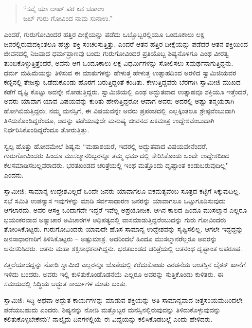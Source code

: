 \begin{verse}
“ಸವೈ ಯಾ ಲಾಖ್ ಪರ ಏಕ ಚಡಾಉ\\ಜಬ್ ಗುರು ಗೋವಿಂದ ನಾಮ ಸುನಾಉ.”
\end{verse}

ಎಂದರೆ, ಗುರುಗೋವಿಂದರ ಹತ್ತಿರ ದೀಕ್ಷೆಯನ್ನು ಪಡೆದು ಒಬ್ಬೊಬ್ಬರಲ್ಲಿಯೂ ಒಂದೂಕಾಲು ಲಕ್ಷ ಜನರಲ್ಲಿರುವುದಕ್ಕಿಂತಲೂ ಹೆಚ್ಚು ಶಕ್ತಿ ಸಂಚರಿಸುತ್ತಿತ್ತು. ಎಂದರೆ ಆತನ ಹತ್ತಿರ ದೀಕ್ಷೆಯನ್ನು ಪಡೆದರೆ ಆತನ ಶಕ್ತಿಯಿಂದ ಜೀವನದಲ್ಲಿ ನಿಜವಾದ ಧರ್ಮಪ್ರಾಣವು ಬಂದು ಗುರುಗೋವಿಂದರ ಪ್ರತಿಯೊಬ್ಬ ಶಿಷ್ಯನೊಳಗೂ ಎಂಥ ವೀರತ್ವ ತುಂಬಿಕೊಳ್ಳುತ್ತಿತ್ತೆಂದರೆ, ಅವನು ಆಗ ಒಂದೂಕಾಲು ಲಕ್ಷ ವಿಧರ್ಮಿಗಳನ್ನು ಸೋಲಿಸಲು ಸಮರ್ಥನಾಗುತ್ತಿದ್ದನು. ಧರ್ಮ ಮಹಿಮೆಯನ್ನು ತಿಳಿಸುವ ಈ ಮಾತುಗಳನ್ನು ಹೇಳುತ್ತ ಹೇಳುತ್ತ ಉತ್ಸಾಹದಿಂದ ಅರಳಿದ ಸ್ವಾಮಿಜಿಯವರ ಕಣ್ಣಿನಲ್ಲಿ ತೇಜಸ್ಸು ಒಡೆದುಕೊಂಡು ಹೊರಗೆ ಬರುತ್ತಿದ್ದಂತೆ ಕಂಡಿತು. ಕೇಳುತ್ತಿದ್ದವರು ಬೆರಗಾಗಿ ಸ್ವಾಮೀಜಿ ಮುಖದ ಕಡೆಗೆ ದೃಷ್ಟಿ ಕೊಟ್ಟು ಅದನ್ನೇ ನೋಡುತ್ತಿದ್ದರು. ಸ್ವಾಮಿಜಿಯಲ್ಲಿ ಎಂಥ ಅದ್ಭುತವಾದ ಉತ್ಸಾಹವೂ ಶಕ್ತಿಯೂ ಇತ್ತೆಂದರೆ, ಅವರು ಯಾವಾಗ ಯಾವ ವಿಷಯವನ್ನು ಕುರಿತು ಹೇಳುತ್ತಿದ್ದರೋ ಆವಾಗ ಅವರು ಅದರಲ್ಲಿ ಅಷ್ಟು ತನ್ಮಯರಾಗಿ ಹೋಗಿಬಿಡುತ್ತಿದ್ದರು; ನಮ್ಮ ಮನಸ್ಸಿಗೆ, ಈ ವಿಷಯವನ್ನೇ ಅವರು ಪ್ರಪಂಚದಲ್ಲಿ ಎಲ್ಲಕ್ಕಿಂತಲೂ ಶ್ರೇಷ್ಠವೆಂಬುದಾಗಿ ತಿಳಿದುಕೊಂಡಿದ್ದರೆಂದೂ, ಅದನ್ನು ಪಡೆಯುವುದೇ ಮನುಷ್ಯ ಜೀವನದ ಏಕಮಾತ್ರ ಉದ್ದೇಶವೆಂಬುದಾಗಿ ನಿರ್ಧರಿಸಿಕೊಂಡಿದ್ದರೆಂದೂ ತೋರುತ್ತಿತ್ತು.

ಸ್ವಲ್ಪ ಹೊತ್ತು ಹೋದಮೇಲೆ ಶಿಷ್ಯನು “ಮಹಾಶಯರೆ, ಇದರಲ್ಲಿ ಅದ್ಭುತವಾದ ವಿಷಯವೇನೆಂದರೆ, ಗುರುಗೋವಿಂದರು ಹಿಂದೂ ಮುಸಲ್ಮಾನರಿಬ್ಬರನ್ನೂ ತಮ್ಮ ಧರ್ಮದಲ್ಲಿ ಸೇರಿಸಿಕೊಂಡು ಒಂದೇ ಉದ್ದೇಶದಿಂದ ಕೆಲಸಮಾಡಿಸಬಲ್ಲವರಾದರು. ಭರತಖಂಡದ ಚರಿತ್ರೆಯಲ್ಲಿ ಇಂಥ ಮತ್ತೊಂದು ದೃಷ್ಟಾಂತ ಕಂಡುಬರುವುದಿಲ್ಲ" ಎಂದನು.

ಸ್ವಾಮೀಜಿ: ಸಾಮಾನ್ಯ ಉದ್ದೇಶವಿಲ್ಲದೆ ಒಂದೇ ಜನರು ಯಾವಾಗಲೂ ಐಕಮತ್ಯವೆಂಬ ಸೂತ್ರದ ಕಟ್ಟಿಗೆ ಸಿಕ್ಕುವುದಿಲ್ಲ. ಸಭೆ ಸಮಿತಿ ಉಪನ್ಯಾಸ ಇವುಗಳನ್ನು ಮಾಡಿ ಸರ್ವಸಾಧಾರಣ ಜನರನ್ನು ಯಾವಾಗಲೂ ಒಟ್ಟುಗೂಡಿಸುವುದು ಆಗಲಾರದು. ಅವರ ಆಸಕ್ತಿ ಒಂದಾಗದೇ ಇದ್ದರೆ ಇವೆಲ್ಲ ಅಪ್ರಯೋಜಕ. ಆಗಿನ ಕಾಲದ ಹಿಂದೂ ಮುಸಲ್ಮಾನ ಎಲ್ಲರೂ ಭಯಂಕರವಾದ ಅತ್ಯಾಚಾರ ಅವಿಚಾರಗಳ ಆಧಿಪತ್ಯದಲ್ಲಿ ವಾಸಮಾಡುತ್ತಿದ್ದರೆಂಬುದನ್ನು ಗುರು ಗೋವಿಂದರು ತೋರಿಸಿಕೊಟ್ಟರು. ಗುರುಗೋವಿಂದರು ಯಾವುದೇ ಹೊಸ ಸಾಮಾನ್ಯ ಉದ್ದೇಶವನ್ನು ಸೃಷ್ಟಿಸಲಿಲ್ಲ. ಆಗಲೇ ಇದ್ದದ್ದನ್ನು ಜನಸಾಧಾರಣರಿಗೆ ತಿಳಿಸಿಕೊಟ್ಟರು – ಅಷ್ಟುಮಾತ್ರ. ಅದರಿಂದಲೆ ಹಿಂದೂ ಮುಸಲ್ಮಾನರೆಲ್ಲರೂ ಅವರನ್ನು ಅನುಸರಿಸಿದರು. ಆತನು ಮಹಾ ಶಕ್ತಿಸಾಧಕನಾಗಿದ್ದನು. ಭರತಖಂಡದ ಚರಿತ್ರೆಯಲ್ಲಿ ಆತನಂಥ ದೃಷ್ಟಾಂತ ಅಪರೂಪ.

ಕತ್ತಲೆಯಾದದ್ದನ್ನು ನೋಡಿ ಸ್ವಾಮಿಜಿ ಎಲ್ಲರನ್ನೂ ಜೊತೆಯಲ್ಲಿ ಕರೆದುಕೊಂಡು ಎರಡನೆಯ ಅಂತಸ್ತಿನ ಬೈಠಕ್ ಖಾನೆಗೆ ಇಳಿದು ಬಂದರು. ಅವರು ಇಲ್ಲಿ ಕುಳಿತುಕೊಂಡೊಡನೆಯೆ ಎಲ್ಲರೂ ಅವರನ್ನು ಸುತ್ತಿಕೊಂಡು ಕುಳಿತರು. ಈ ಸಮಯದಲ್ಲಿ ಸಿದ್ಧಿಯ ಅದ್ಭುತ ಕಾರ್ಯಗಳ ಮಾತು ಬಂತು.

ಸ್ವಾಮಿಜಿ: ಸಿದ್ಧಿ ಅಥವಾ ಅದ್ಭುತ ಕಾರ್ಯಗಳನ್ನು ಮಾಡುವ ಶಕ್ತಿಯನ್ನು ಅತಿ ಸಾಮಾನ್ಯವಾದ ಚಿತ್ತಸಂಯಮದಿಂದಲೇ ಪಡೆಯಬಹುದು ಎಂದರು. ಶಿಷ್ಯನನ್ನು ನೋಡಿ ಮತ್ತೊಬ್ಬರ ಮನಸ್ಸಿನಲ್ಲಿರುವುದನ್ನು ತಿಳಿದುಕೊಳ್ಳುವುದನ್ನು ಕಲಿತುಕೊಳ್ಳಬೇಕೇನು? ನಾಲ್ಕೈದು ದಿನಗಳಲ್ಲಿಯೆ ಈ ವಿದ್ಯೆಯನ್ನು ಕಲಿಸಿಕೊಡಬಲ್ಲೆ ಎಂದು ಹೇಳಿದರು.

